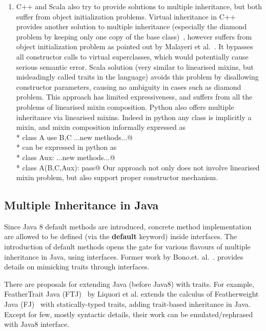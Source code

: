 \begin{enumerate}
\item C++ and Scala also try to provide solutions to multiple inheritance, but
  both suffer from object initialization problems. Virtual inheritance in C++
  provides another solution to multiple inheritance (especially the diamond
  problem by keeping only one copy of the base class)~\cite{ellis1990annotated},
  however suffers from object initialization problem as pointed out by Malayeri
  et al.~\cite{malayeri2009cz}. It bypasses all constructor calls to virtual
  superclasses, which would potentially cause serious semantic error. Scala
  solution (very similar to linearised mixins, but misleadingly called traits in
  the language) avoids this problem by disallowing constructor parameters,
  causing no ambiguity in cases such as diamond problem.  This approach has
  limited expressiveness, and suffers from all the problems of linearised mixin
  composition.
  Python also offers multiple inheritance via linearised mixins. Indeed in python any class is implicitly a mixin, and mixin composition informally expressed as\\*
  \Q@ class A use B,C {...new methods...}@\\*
  can be expressed in python as \\*
  \Q@ class Aux: ...new methods...@\\*
  \Q@ class A(B,C,Aux): pass@
  Our approach not only does not involve linearised mixin problem, but also
  support proper constructor mechanism.
\end{enumerate}

\subsection{Multiple Inheritance in Java}
Since Java 8 default methods are introduced, concrete method implementation are
allowed to be defined (via the \textbf{default} keyword) inside
interfaces. 
The introduction of default methods opens the
gate for various flavours of multiple inheritance in Java, using interfaces.
Former work by Bono.et. al.~\cite{bono14}. provides details on mimicking traits
through interfaces.

There are proposals for extending Java (before Java8) with traits. For example,
FeatherTrait Java (FTJ)~\cite{Liquori08ftj} by Liquori et al. extends the
calculus of Featherweight Java (FJ)~\cite{Igarashi01FJ} with statically-typed
traits, adding trait-based inheritance in Java.  Except for few, mostly
syntactic details, their work can be emulated/rephrased with Java8 interface.


